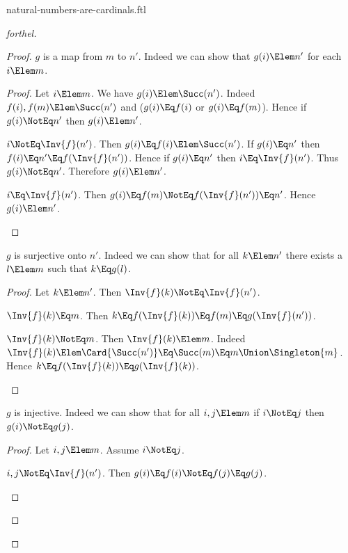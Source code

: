 \documentclass{stex}
\begin{document}
\begin{smodule}{natural-numbers-are-cardinals.ftl}
\begin{proof}[forthel]
\begin{proof}
      $g$ is a map from $m$ to $n'$.
      Indeed we can show that $g(i) \Elem n'$ for each $i \Elem m$.
      \begin{proof}
        Let $i \Elem m$.
        We have $g(i) \Elem \Succ(n')$.
        Indeed $f(i), f(m) \Elem \Succ(n')$ and ($g(i) \Eq f(i)$ or $g(i) \Eq f(m)$).
        Hence if $g(i) \NotEq n'$ then $g(i) \Elem n'$.

        \begin{case}{$i \NotEq \Inv{f}(n')$.}
          Then $g(i) \Eq f(i) \Elem \Succ(n')$.
          If $g(i) \Eq n'$ then $f(i) \Eq n' \Eq f(\Inv{f}(n'))$.
          Hence if $g(i) \Eq n'$ then $i \Eq \Inv{f}(n')$.
          Thus $g(i) \NotEq n'$.
          Therefore $g(i) \Elem n'$.
        \end{case}

        \begin{case}{$i \Eq \Inv{f}(n')$.}
          Then $g(i)
            \Eq f(m)
            \NotEq f(\Inv{f}(n'))
            \Eq n'$.
          Hence $g(i) \Elem n'$.
        \end{case}
      \end{proof}

      $g$ is surjective onto $n'$.
      Indeed we can show that for all $k \Elem n'$ there exists a $l \Elem m$ such that $k \Eq g(l)$.
      \begin{proof}
        Let $k \Elem n'$.
        Then $\Inv{f}(k) \NotEq \Inv{f}(n')$.

        \begin{case}{$\Inv{f}(k) \Eq m$.}
          Then $k
            \Eq f(\Inv{f}(k))
            \Eq f(m)
            \Eq g(\Inv{f}(n'))$.
        \end{case}

        \begin{case}{$\Inv{f}(k) \NotEq m$.}
          Then $\Inv{f}(k) \Elem m$.
          Indeed $\Inv{f}(k) \Elem \Card{\Succ(n')} \Eq \Succ(m) \Eq m \Union \Singleton{m}$.
          Hence $k
            \Eq f(\Inv{f}(k))
            \Eq g(\Inv{f}(k))$.
        \end{case}
      \end{proof}

      $g$ is injective.
      Indeed we can show that for all $i, j \Elem m$ if $i \NotEq j$ then $g(i) \NotEq g(j)$.
      \begin{proof}
        Let $i, j \Elem m$.
        Assume $i \NotEq j$.

        \begin{case}{$i, j \NotEq \Inv{f}(n')$.}
          Then $g(i)
            \Eq f(i)
            \NotEq f(j)
            \Eq g(j)$.
        \end{case}


\end{proof}
\end{proof}
\end{proof}
\end{smodule}
\end{document}
